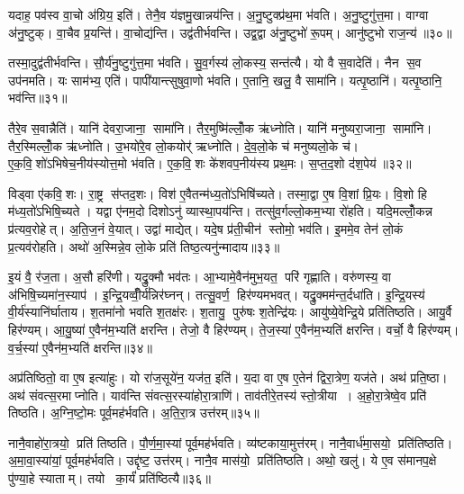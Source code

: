यदाह॒ पव॑स्व वा॒चो अ॑ग्रिय॒ इति॑। तेनै॒व य॑ज्ञमु॒खान्नय॑न्ति। अ॒नु॒ष्टुक्प्र॑थ॒मा भ॑वति। अ॒नु॒ष्टुगु॑त्त॒मा। वाग्वा अ॑नु॒ष्टुक्। वा॒चैव प्र॒यन्ति॑। वा॒चोद्य॑न्ति। उद्व॑तीर्भवन्ति। उद्व॒द्वा अ॑नु॒ष्टुभो॑ रू॒पम्। आनु॑ष्टुभो राज॒न्य॑॥३०॥

तस्मा॒दुद्व॑तीर्भवन्ति। सौ॒र्य॑नु॒ष्टुगु॑त्त॒मा भ॑वति। सु॒व॒र्गस्य॑ लो॒कस्य॒ सन्त॑त्यै। यो वै स॒वादेति॑। नैन स॒व उप॑नमति। यः साम॑भ्य॒ एति॑। पापी॑यान्त्सुषुवा॒णो भ॑वति। ए॒तानि॒ खलु॒ वै सामा॑नि। यत्पृ॒ष्ठानि॑। यत्पृ॒ष्ठानि॒ भव॑न्ति॥३१॥

तैरे॒व स॒वान्नैति॑। यानि॑ देवरा॒जाना॒ सामा॑नि। तैर॒मुष्मि॑ल्लोँ॒क ऋ॑ध्नोति। यानि॑ मनुष्यरा॒जाना॒ सामा॑नि। तैर॒स्मिल्लोँ॒क ऋ॑ध्नोति। उ॒भयो॑रे॒व लो॒कयोर्॑ ऋध्नोति। दे॒व॒लो॒के च॑ मनुष्यलो॒के च॑। ए॒क॒वि॒शो॑ऽभिषेच॒नीय॑स्योत्त॒मो भ॑वति। ए॒क॒वि॒शः के॑शवप॒नीय॑स्य प्रथ॒मः। स॒प्त॒द॒शो द॑श॒पेय॑॥३२॥

विड्वा ए॑कवि॒शः। रा॒ष्ट्र स॑प्तद॒शः। विश॑ ए॒वैतन्म॑ध्य॒तो॑ऽभिषि॑च्यते। तस्मा॒द्वा ए॒ष वि॒शां प्रि॒यः। वि॒शो हि म॑ध्य॒तो॑ऽभिषि॒च्यते। यद्वा ए॑नम॒दो दिशोऽनु॑ व्यास्था॒पय॑न्ति। तत्सु॑व॒र्गल्लो॒कम॒भ्या रो॑हति। यदि॒मल्लोँ॒कन्न प्र॑त्यव॒रोहेत्। अ॒ति॒ज॒नं वे॒यात्। उद्वा॑ माद्येत्। यदे॒ष प्र॑ती॒चीन॑ स्तोमो॒ भव॑ति। इ॒ममे॒व तेन॑ लो॒कं प्र॒त्यव॑रोहति। अथो॑ अ॒स्मिन्ने॒व लो॒के प्रति॑ तिष्ठ॒त्यनु॑न्मादाय॥३३॥\anuvakamend[अक्र॑न्राज॒न्यो॑ भव॑न्ति दश॒पेयो॑ माद्ये॒त्रीणि॑ च]

इ॒यं वै॒ र॑ज॒ता। अ॒सौ हरि॑णी। यद्रु॒क्मौ भव॑तः। आ॒भ्यामे॒वैन॑मुभ॒यत॒ परि॑ गृह्णाति। वरु॑णस्य॒ वा अ॑भिषि॒च्यमा॑न॒स्याप॑। इ॒न्द्रि॒यव्वीँ॒र्य॑न्निर॑घ्नन्। तत्सु॒वर्ण॒ हिर॑ण्यमभवत्। यद्रु॒क्मम॑न्त॒र्दधा॑ति। इ॒न्द्रि॒यस्य॑ वी॒र्य॑स्यानि॑र्घाताय। श॒तमा॑नो भवति श॒तक्ष॑रः। श॒तायु॒ पुरु॑षः श॒तेन्द्रि॑यः। आयु॑ष्ये॒वेन्द्रि॒ये प्रति॑तिष्ठति। आयु॒र्वै हिर॑ण्यम्। आ॒यु॒ष्या॑ ए॒वैन॑म॒भ्यति॑ क्षरन्ति। तेजो॒ वै हिर॑ण्यम्। ते॒ज॒स्या॑ ए॒वैन॑म॒भ्यति॑ क्षरन्ति। वर्चो॒ वै हिर॑ण्यम्। व॒र्च॒स्या॑ ए॒वैन॑म॒भ्यति॑ क्षरन्ति॥३४॥\anuvakamend[श॒तक्ष॑रो॒ऽष्टौ च॑]

अप्र॑तिष्ठितो॒ वा ए॒ष इत्या॑हुः। यो रा॑ज॒सूये॑न॒ यज॑त॒ इति॑। य॒दा वा ए॒ष ए॒तेन॑ द्विरा॒त्रेण॒ यज॑ते। अथ॑ प्रति॒ष्ठा। अथ॑ संवत्स॒रमाप्नोति। याव॑न्ति संवत्स॒रस्या॑होरा॒त्राणि॑। ताव॑तीरे॒तस्य॑ स्तो॒त्रीया। अ॒हो॒रा॒त्रेष्वे॒व प्रति॑ तिष्ठति। अ॒ग्नि॒ष्टो॒मः पूर्व॒मह॑र्भवति। अ॒ति॒रा॒त्र उत्त॑रम्॥३५॥

नानै॒वाहो॑रा॒त्रयो॒ प्रति॑ तिष्ठति। पौ॒र्ण॒मा॒स्यां पूर्व॒मह॑र्भवति। व्य॑ष्टकाया॒मुत्त॑रम्। नानै॒वार्ध॑मा॒सयो॒ प्रति॑तिष्ठति। अ॒मा॒वा॒स्या॑यां॒ पूर्व॒मह॑र्भवति। उद्दृ॑ष्ट॒ उत्त॑रम्। नानै॒व मास॑यो॒ प्रति॑तिष्ठति। अथो॒ खलु॑। ये ए॒व स॑मानप॒क्षे पु॑ण्या॒हे स्याताम्। तयो का॒र्यं॑ प्रति॑ष्ठित्यै॥३६॥

